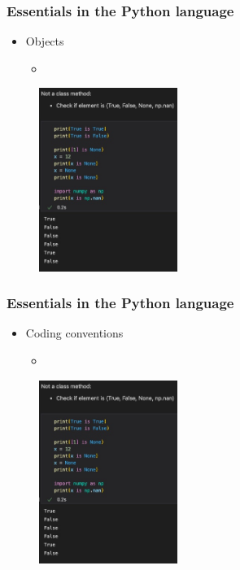 \begin{frame}\frametitle{Essentials in the Python language}
   \begin{minipage}{0.48\linewidth}
      \begin{itemize}
         \item Objects
         \begin{itemize}
            \item
         \end{itemize}
      \end{itemize}
   \end{minipage}
   \begin{minipage}{0.48\linewidth}
      \begin{figure}[H]
         \includegraphics[width=4.5cm]{../images/illustrations/is.jpg}
      \end{figure}
   \end{minipage}
\end{frame}


\begin{frame}\frametitle{Essentials in the Python language}
   \begin{minipage}{0.48\linewidth}
      \begin{itemize}
         \item Coding conventions
         \begin{itemize}
            \item
         \end{itemize}
      \end{itemize}
   \end{minipage}
   \begin{minipage}{0.48\linewidth}
      \begin{figure}[H]
         \includegraphics[width=4.5cm]{../images/illustrations/is.jpg}
      \end{figure}
   \end{minipage}
\end{frame}


